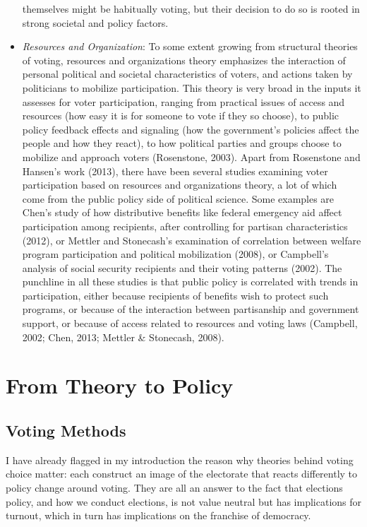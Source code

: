 \documentclass[12pt,twoside]{reedthesis}
\begin{document}
\begin{itemize}
    themselves might be habitually voting, but their decision to do so is
    rooted in strong societal and policy factors.
  \item
    \emph{Resources and Organization}: To some extent growing from
    structural theories of voting, resources and organizations theory
    emphasizes the interaction of personal political and societal
    characteristics of voters, and actions taken by politicians to
    mobilize participation. This theory is very broad in the inputs it
    assesses for voter participation, ranging from practical issues of
    access and resources (how easy it is for someone to vote if they so
    choose), to public policy feedback effects and signaling (how the
    government's policies affect the people and how they react), to how
    political parties and groups choose to mobilize and approach voters
    (Rosenstone, 2003). Apart from Rosenstone and Hansen's work (2013),
    there have been several studies examining voter participation based on
    resources and organizations theory, a lot of which come from the
    public policy side of political science. Some examples are Chen's
    study of how distributive benefits like federal emergency aid affect
    participation among recipients, after controlling for partisan
    characteristics (2012), or Mettler and Stonecash's examination of
    correlation between welfare program participation and political
    mobilization (2008), or Campbell's analysis of social security
    recipients and their voting patterns (2002). The punchline in all
    these studies is that public policy is correlated with trends in
    participation, either because recipients of benefits wish to protect
    such programs, or because of the interaction between partisanship and
    government support, or because of access related to resources and
    voting laws (Campbell, 2002; Chen, 2013; Mettler \& Stonecash, 2008).
  \end{itemize}
  
  \section{From Theory to Policy}\label{from-theory-to-policy}
  
  \subsection{Voting Methods}\label{voting-methods}
  
  I have already flagged in my introduction the reason why theories behind
  voting choice matter: each construct an image of the electorate that
  reacts differently to policy change around voting. They are all an
  answer to the fact that elections policy, and how we conduct elections,
  is not value neutral but has implications for turnout, which in turn has
  implications on the franchise of democracy.
  
\end{document}
